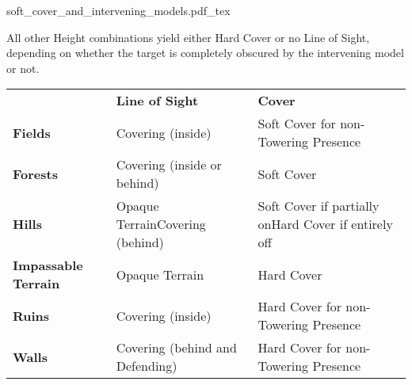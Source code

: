 \documentclass[a4paper,10pt]{article}
\begin{document}
\newcommand{\figureLoSCSoftcover}{\largerfontsize{Soft Cover (\minuss{}1 to hit)}}
\newcommand{\figureLoSCNocover}{\largerfontsize{No Cover}}
\newcommand{\figureLoSCStandard}{Standard}
\newcommand{\figureLoSCLarge}{Large}
\newcommand{\figureLoSCGigantic}{Gigantic}

\begin{center}
\def\svgwidth{0.6\textwidth}
{soft_cover_and_intervening_models.pdf_tex}
\end{center}

All other Height combinations yield either Hard Cover or no Line of Sight, depending on whether the target is completely obscured by the intervening model or not.

\begin{center}\alternaterowcolors
\begin{tabular}{>{\bfseries}m{3cm}m{4.5cm}m{5cm}}
\hline
 & \textbf{Line of Sight} & \textbf{Cover} \\
Fields & Covering (inside) & Soft Cover for non-Towering Presence \\
Forests & Covering (inside or behind) & Soft Cover \\
Hills & Opaque Terrain\newline Covering (behind) & Soft Cover if partially on\newline Hard Cover if entirely off \\
Impassable Terrain & Opaque Terrain & Hard Cover \\
Ruins & Covering (inside) & Hard Cover for non-Towering Presence \\
Walls & Covering (behind and Defending) & Hard Cover for non-Towering Presence \\
\hline
\end{tabular}\end{center}


\newpage

\end{document}
